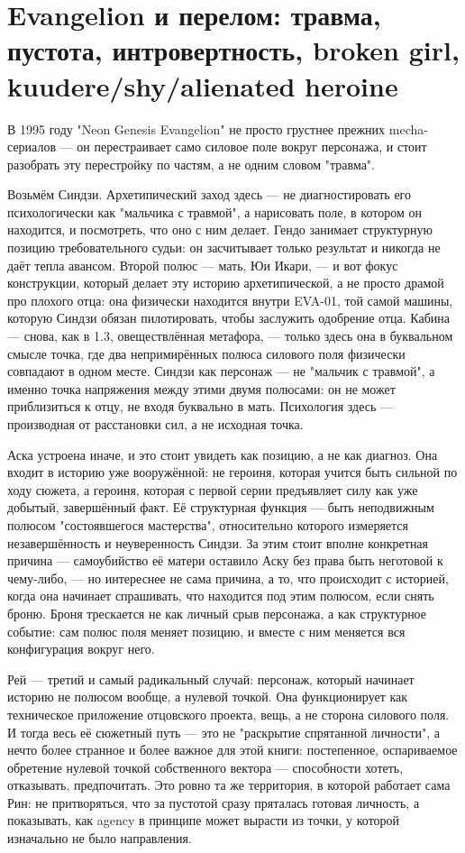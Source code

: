 \section{Evangelion и перелом: травма, пустота, интровертность, broken girl, kuudere/shy/alienated heroine}

В 1995 году "Neon Genesis Evangelion" не просто грустнее прежних mecha-сериалов — он перестраивает само силовое поле вокруг персонажа, и стоит разобрать эту перестройку по частям, а не одним словом "травма".

Возьмём Синдзи. Архетипический заход здесь — не диагностировать его психологически как "мальчика с травмой", а нарисовать поле, в котором он находится, и посмотреть, что оно с ним делает. Гендо занимает структурную позицию требовательного судьи: он засчитывает только результат и никогда не даёт тепла авансом. Второй полюс — мать, Юи Икари, — и вот фокус конструкции, который делает эту историю архетипической, а не просто драмой про плохого отца: она физически находится внутри EVA-01, той самой машины, которую Синдзи обязан пилотировать, чтобы заслужить одобрение отца. Кабина — снова, как в 1.3, овеществлённая метафора, — только здесь она в буквальном смысле точка, где два непримирённых полюса силового поля физически совпадают в одном месте. Синдзи как персонаж — не "мальчик с травмой", а именно точка напряжения между этими двумя полюсами: он не может приблизиться к отцу, не входя буквально в мать. Психология здесь — производная от расстановки сил, а не исходная точка.

Аска устроена иначе, и это стоит увидеть как позицию, а не как диагноз. Она входит в историю уже вооружённой: не героиня, которая учится быть сильной по ходу сюжета, а героиня, которая с первой серии предъявляет силу как уже добытый, завершённый факт. Её структурная функция — быть неподвижным полюсом "состоявшегося мастерства", относительно которого измеряется незавершённость и неуверенность Синдзи. За этим стоит вполне конкретная причина — самоубийство её матери оставило Аску без права быть неготовой к чему-либо, — но интереснее не сама причина, а то, что происходит с историей, когда она начинает спрашивать, что находится под этим полюсом, если снять броню. Броня трескается не как личный срыв персонажа, а как структурное событие: сам полюс поля меняет позицию, и вместе с ним меняется вся конфигурация вокруг него.

Рей — третий и самый радикальный случай: персонаж, который начинает историю не полюсом вообще, а нулевой точкой. Она функционирует как техническое приложение отцовского проекта, вещь, а не сторона силового поля. И тогда весь её сюжетный путь — это не "раскрытие спрятанной личности", а нечто более странное и более важное для этой книги: постепенное, оспариваемое обретение нулевой точкой собственного вектора — способности хотеть, отказывать, предпочитать. Это ровно та же территория, в которой работает сама Рин: не притворяться, что за пустотой сразу пряталась готовая личность, а показывать, как agency в принципе может вырасти из точки, у которой изначально не было направления.

